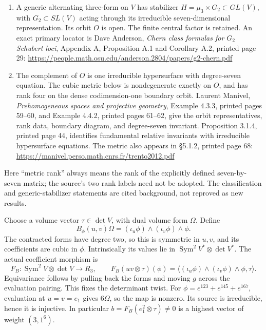 \documentclass[
  10pt,
]{article}
\begin{document}
\begin{enumerate}
\def\labelenumi{\arabic{enumi}.}
\item
  A generic alternating three-form on \(V\) has stabilizer
  \(H=\mu_3\times G_2\subset GL(V)\), with \(G_2\subset SL(V)\) acting
  through its irreducible seven-dimensional representation. Its orbit
  \(O\) is open. The finite central factor is retained. An exact primary
  locator is Dave Anderson, \emph{Chern class formulas for \(G_2\)
  Schubert loci}, Appendix A, Proposition A.1 and Corollary A.2, printed
  page 29:
  \url{https://people.math.osu.edu/anderson.2804/papers/g2-chern.pdf}
\item
  The complement of \(O\) is one irreducible hypersurface with
  degree-seven equation. The cubic metric below is nondegenerate exactly
  on \(O\), and has rank four on the dense codimension-one boundary
  orbit. Laurent Manivel, \emph{Prehomogeneous spaces and projective
  geometry}, Example 4.3.3, printed pages 59--60, and Example 4.4.2,
  printed pages 61--62, give the orbit representatives, rank data,
  boundary diagram, and degree-seven invariant. Proposition 3.1.4,
  printed page 44, identifies fundamental relative invariants with
  irreducible hypersurface equations. The metric also appears in §5.1.2,
  printed page 68:
  \url{https://manivel.perso.math.cnrs.fr/trento2012.pdf}
\end{enumerate}

Here ``metric rank'' always means the rank of the explicitly defined
seven-by-seven matrix; the source's two rank labels need not be adopted.
The classification and generic-stabilizer statements are cited
background, not reproved as new results.

Choose a volume vector \(\tau\in\det V\), with dual volume form
\(\Omega\). Define \[
B_\phi(u,v)\Omega=(\iota_u\phi)\wedge(\iota_v\phi)\wedge\phi.
\tag{W7.3}
\] The contracted forms have degree two, so this is symmetric in
\(u,v\), and its coefficients are cubic in \(\phi\). Intrinsically its
values lie in \(\operatorname{Sym}^2V^*\otimes\det V^*\). The actual
coefficient morphism is \[
F_B:\operatorname{Sym}^2V\otimes\det V\longrightarrow R_3,\qquad
F_B(uv\otimes\tau)(\phi)
=\langle(\iota_u\phi)\wedge(\iota_v\phi)\wedge\phi,\tau\rangle.
\tag{W7.4}
\] Equivariance follows by pulling back the forms and moving \(g\)
across the evaluation pairing. This fixes the determinant twist. For
\(\phi=e^{123}+e^{145}+e^{167}\), evaluation at \(u=v=e_1\) gives
\(6\Omega\), so the map is nonzero. Its source is irreducible, hence it
is injective. In particular \(b=F_B(e_1^2\otimes\tau)\ne0\) is a highest
vector of weight \((3,1^6)\).
\end{document}
